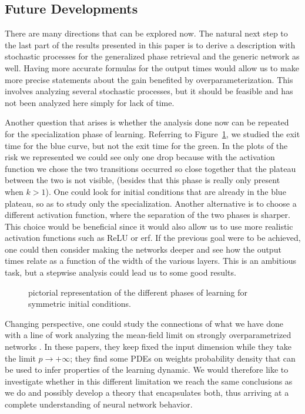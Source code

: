 \subsection*{Future Developments}
There are many directions that can be explored now.
The natural next step to the last part of the results presented in this paper is to derive a description with stochastic processes for the generalized phase retrieval and the generic network as well.
Having more accurate formulas for the output times would allow us to make more precise statements about the gain benefited by overparameterization.
This involves analyzing several stochastic processes, but it should be feasible and has not been analyzed here simply for lack of time.

Another question that arises is whether the analysis done now can be repeated for the specialization phase of learning. Referring to Figure~\ref{fig:pictorial-symmetric-learning2}, we studied the exit time for the blue curve, but not the exit time for the green. 
In the plots of the risk we represented we could see only one drop because with the activation function we chose the two transitions occurred so close together that the plateau between the two is not visible, (besides that this phase is really only present when \(k>1\)). 
One could look for initial conditions that are already in the blue plateau, so as to study only the specialization. Another alternative is to choose a different activation function, where the separation of the two phases is sharper. 
This choice would be beneficial since it would also allow us to use more realistic activation functions such as ReLU or erf.
If the previous goal were to be achieved, one could then consider making the networks deeper and see how the output times relate as a function of the width of the various layers. This is an ambitious task, but a stepwise analysis could lead us to some good results.
\begin{figure}
  \centering
  \begin{tikzpicture}[
    x=1.cm,
    y=1.cm
  ]
    
  \end{tikzpicture}
  \caption{
    pictorial representation of the different phases of learning for symmetric initial conditions.
  }
  \label{fig:pictorial-symmetric-learning2}
\end{figure}

Changing perspective, one could study the connections of what we have done with a line of work analyzing the mean-field limit on strongly overparametrized networks \cite{mei2018mean, chizat2018global,rotskoff2018trainability, sirignano2020mean}.
In these papers, they keep fixed the input dimension while they take the limit \(p\to+\infty\);
they find some PDEs on weights probability density that can be used to infer properties of the learning dynamic.
We would therefore like to investigate whether in this different limitation we reach the same conclusions as we do and possibly develop a theory that encapsulates both,
thus arriving at a complete understanding of neural network behavior.

